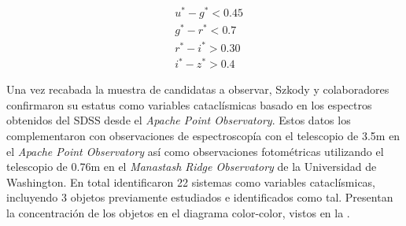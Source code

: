 \begin{equation}
	\begin{split}
		& u^* - g^* < 0.45 \\
		& g^* - r^* < 0.7 \\
		& r^* - i^* > 0.30 \\
		& i^* - z^* > 0.4
	\end{split}
	\label{muestra:szkody2002:criterioeqs}
\end{equation}

Una vez recabada la muestra de candidatas a observar, Szkody y colaboradores
confirmaron su estatus como variables cataclísmicas basado en los espectros
obtenidos del SDSS desde el \textit{Apache Point Observatory}. Estos datos los
complementaron con observaciones de espectroscopía con el telescopio de 3.5m en
el \textit{Apache Point Observatory} así como observaciones fotométricas utilizando el
telescopio de 0.76m en el \textit{Manastash Ridge Observatory} de la Universidad
de Washington. En total identificaron 22 sistemas como variables cataclísmicas,
incluyendo 3 objetos previamente estudiados e identificados como tal. Presentan
la concentración de los objetos en el diagrama color-color, vistos en la
. 

